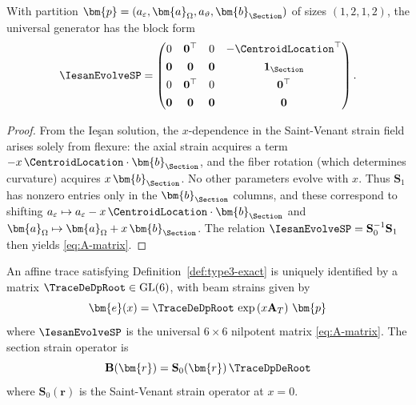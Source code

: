 \begin{Quote}
\begin{lemma}
\label{lem:A-explicit}
With partition $\bm{p} = (a_\varepsilon, \bm{a}_\Omega, a_\vartheta, \bm{b}_{\Section})$ 
of sizes $(1, 2, 1, 2)$, the universal generator has the block form
\begin{equation}
\IesanEvolveSP = \begin{pmatrix}
0 & \mathbf{0}^\top & 0 & -\CentroidLocation^\top \\[4pt]
\mathbf{0} & \mathbf{0} & \mathbf{0} & \mathbf{1}_\Section \\[4pt]
0 & \mathbf{0}^\top & 0 & \mathbf{0}^\top \\[4pt]
\mathbf{0} & \mathbf{0} & \mathbf{0} & \mathbf{0}
\end{pmatrix}.
\end{equation}
\end{lemma}

\begin{proof}
From the Ieşan solution, the $x$-dependence in the Saint-Venant strain field 
arises solely from flexure: the axial strain acquires a term 
$-x\,\CentroidLocation \cdot \bm{b}_{\Section}$, and the fiber rotation 
(which determines curvature) acquires $x\,\bm{b}_{\Section}$. 
No other parameters evolve with $x$. Thus $\mathbf{S}_1$ has nonzero entries 
only in the $\bm{b}_{\Section}$ columns, and these correspond to shifting 
$a_\varepsilon \mapsto a_\varepsilon - x\,\CentroidLocation \cdot \bm{b}_{\Section}$ 
and $\bm{a}_\Omega \mapsto \bm{a}_\Omega + x\,\bm{b}_{\Section}$. 
The relation $\IesanEvolveSP = \mathbf{S}_0^{-1}\mathbf{S}_1$ then yields \eqref{eq:A-matrix}.
\end{proof}
\end{Quote}


\begin{proposition}
\label{prop:universal-evolution}
An affine trace satisfying Definition~\ref{def:type3-exact} is uniquely identified by a matrix 
$\TraceDeDpRoot \in \mathrm{GL}(6)$, with beam strains given by
\begin{equation*}
\bm{e}(x) = \TraceDeDpRoot\,\exp\left(x\mathbf{A}_T\right)\,\bm{p}
\end{equation*}
where $\IesanEvolveSP$ is the universal $6\times6$ nilpotent matrix \eqref{eq:A-matrix}. 
The section strain operator is
\begin{equation}
\mathbf{B}(\bm{r}) = \mathbf{S}_0(\bm{r})\,\TraceDpDeRoot
\label{eq:B-from-T0}
\end{equation}
where $\mathbf{S}_0(\bm{r})$ is the Saint-Venant strain operator at $x = 0$.
\end{proposition}


